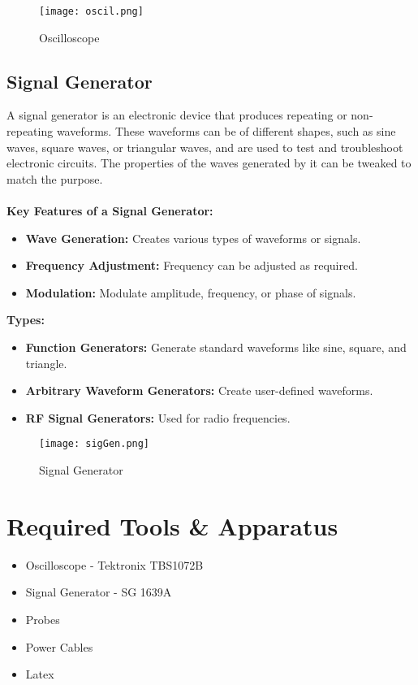 \documentclass[12pt]{article}
\begin{document}
\begin{figure}[H]
    \centering
    \texttt{[image: oscil.png]}
    \caption{Oscilloscope}
\end{figure}

\subsection*{Signal Generator}
A signal generator is an electronic device that produces repeating or non-repeating waveforms. These waveforms can be of different shapes, such as sine waves, square waves, or triangular waves, and are used to test and troubleshoot electronic circuits. The properties of the waves generated by it can be tweaked to match the purpose.\\\\
\textbf{Key Features of a Signal Generator:}
\begin{itemize}
    \item \textbf{Wave Generation:} Creates various types of waveforms or signals.
    \item \textbf{Frequency Adjustment:} Frequency can be adjusted as required.
    \item \textbf{Modulation:} Modulate amplitude, frequency, or phase of signals.\\
\end{itemize}
\textbf{Types:}
\begin{itemize}
    \item \textbf{Function Generators:} Generate standard waveforms like sine, square, and triangle.
    \item \textbf{Arbitrary Waveform Generators:} Create user-defined waveforms.
    \item \textbf{RF Signal Generators:} Used for radio frequencies.
\end{itemize}

\begin{figure}[H]
    \centering
    \texttt{[image: sigGen.png]}
    \caption{Signal Generator}
\end{figure}


\section*{Required Tools \& Apparatus}
\begin{itemize}
    \item Oscilloscope - Tektronix TBS1072B
    \item Signal Generator - SG 1639A
    \item Probes
    \item Power Cables
    \item Latex
\end{itemize}
\end{document}
